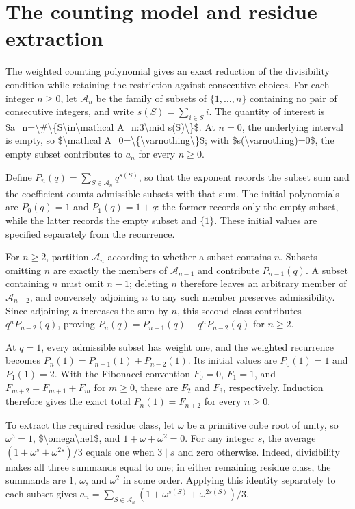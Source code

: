 \documentclass[11pt]{article}
\begin{document}
\section{The counting model and residue extraction}
The weighted counting polynomial gives an exact reduction of the divisibility condition while retaining the restriction against consecutive choices. For each integer $n\geq 0$, let $\mathcal A_n$ be the family of subsets of $\{1,\ldots,n\}$ containing no pair of consecutive integers, and write $s(S)=\sum_{i\in S}i$. The quantity of interest is \$a\_n=\textbackslash{}\#\textbackslash{}\{S\textbackslash{}in\textbackslash{}mathcal A\_n:3\textbackslash{}mid s(S)\textbackslash{}\}\$. At $n=0$, the underlying interval is empty, so \$\textbackslash{}mathcal A\_0=\textbackslash{}\{\textbackslash{}varnothing\textbackslash{}\}\$; with \$s(\textbackslash{}varnothing)=0\$, the empty subset contributes to $a_n$ for every $n\geq0$.

Define $P_n(q)=\sum_{S\in\mathcal A_n}q^{s(S)}$, so that the exponent records the subset sum and the coefficient counts admissible subsets with that sum. The initial polynomials are $P_0(q)=1$ and $P_1(q)=1+q$: the former records only the empty subset, while the latter records the empty subset and $\{1\}$. These initial values are specified separately from the recurrence.

For $n\geq2$, partition $\mathcal A_n$ according to whether a subset contains $n$. Subsets omitting $n$ are exactly the members of $\mathcal A_{n-1}$ and contribute $P_{n-1}(q)$. A subset containing $n$ must omit $n-1$; deleting $n$ therefore leaves an arbitrary member of $\mathcal A_{n-2}$, and conversely adjoining $n$ to any such member preserves admissibility. Since adjoining $n$ increases the sum by $n$, this second class contributes $q^nP_{n-2}(q)$, proving $P_n(q)=P_{n-1}(q)+q^nP_{n-2}(q)$ for $n\geq2$.

At $q=1$, every admissible subset has weight one, and the weighted recurrence becomes $P_n(1)=P_{n-1}(1)+P_{n-2}(1)$. Its initial values are $P_0(1)=1$ and $P_1(1)=2$. With the Fibonacci convention $F_0=0$, $F_1=1$, and $F_{m+2}=F_{m+1}+F_m$ for $m\geq0$, these are $F_2$ and $F_3$, respectively. Induction therefore gives the exact total $P_n(1)=F_{n+2}$ for every $n\geq0$.

To extract the required residue class, let $\omega$ be a primitive cube root of unity, so $\omega^3=1$, \$\textbackslash{}omega\textbackslash{}ne1\$, and $1+\omega+\omega^2=0$. For any integer $s$, the average $(1+\omega^s+\omega^{2s})/3$ equals one when $3\mid s$ and zero otherwise. Indeed, divisibility makes all three summands equal to one; in either remaining residue class, the summands are $1$, $\omega$, and $\omega^2$ in some order. Applying this identity separately to each subset gives $a_n=\sum_{S\in\mathcal A_n}(1+\omega^{s(S)}+\omega^{2s(S)})/3$.
\end{document}
